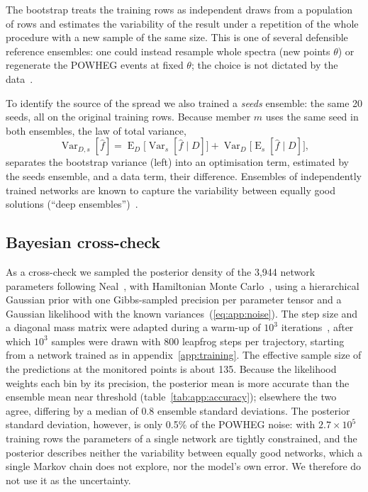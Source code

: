 The bootstrap treats the training rows as independent draws from a population of rows and
estimates the variability of the result under a repetition of the whole procedure with a
new sample of the same size. This is one of several defensible reference ensembles: one
could instead resample whole spectra (new points $\theta$) or regenerate the POWHEG events
at fixed $\theta$; the choice is not dictated by the data~\cite{Freedman:1981,Davison:1997}.

To identify the source of the spread we also trained a \emph{seeds} ensemble: the same 20
seeds, all on the original training rows. Because member $m$ uses the same seed in both
ensembles, the law of total variance,
\begin{equation}
  \operatorname{Var}_{D,s}[\hat f] =
  \operatorname{E}_D\big[\operatorname{Var}_s[\hat f \mid D]\big]
  + \operatorname{Var}_D\big[\operatorname{E}_s[\hat f \mid D]\big] ,
  \label{eq:app:totvar}
\end{equation}
separates the bootstrap variance (left) into an optimisation term, estimated by the seeds
ensemble, and a data term, their difference. Ensembles of independently trained networks
are known to capture the variability between equally good solutions (``deep
ensembles'')~\cite{Lakshminarayanan:2016,Wilson:2020}.

\subsection{Bayesian cross-check}
\label{app:bnn}

As a cross-check we sampled the posterior density of the 3,944 network parameters
following Neal~\cite{Neal:1996}, with Hamiltonian Monte Carlo~\cite{Duane:1987,Neal:2011},
using a hierarchical Gaussian prior with one Gibbs-sampled precision per parameter tensor
and a Gaussian likelihood with the known variances~(\ref{eq:app:noise}). The step size and
a diagonal mass matrix were adapted during a warm-up of $10^3$
iterations~\cite{Hoffman:2014}, after which $10^3$ samples were drawn with 800 leapfrog
steps per trajectory, starting from a network trained as in appendix~\ref{app:training}.
The effective sample size of the predictions at the monitored points is about 135.
Because the likelihood weights each bin by its precision, the posterior mean is more
accurate than the ensemble mean near threshold (table~\ref{tab:app:accuracy}); elsewhere
the two agree, differing by a median of 0.8 ensemble standard deviations. The posterior
standard deviation, however, is only 0.5\% of the POWHEG noise: with
$2.7 \times 10^5$ training rows the parameters of a single network are tightly
constrained, and the posterior describes neither the variability between equally good
networks, which a single Markov chain does not explore, nor the model's own error. We
therefore do not use it as the uncertainty.

